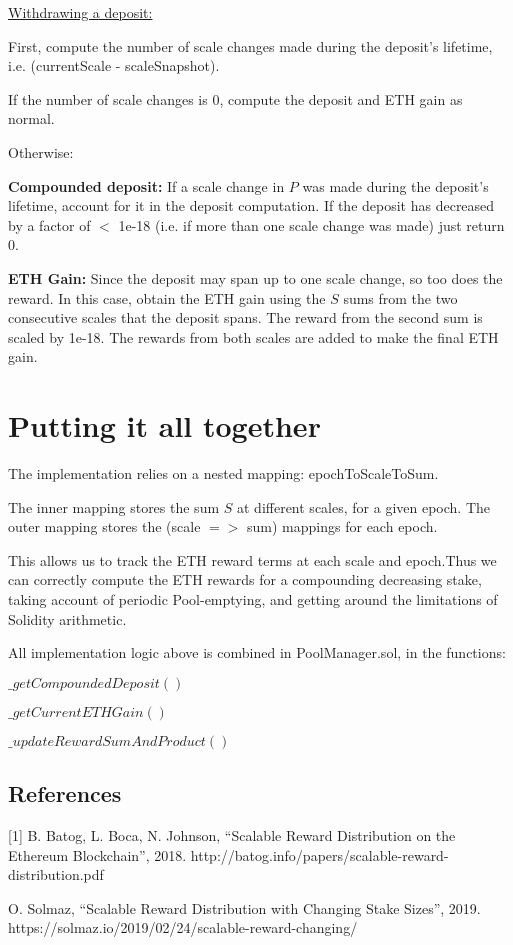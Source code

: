 \documentclass[reqno]{article}
\begin{document}
\bigskip
\underline{Withdrawing a deposit:}

First, compute the number of scale changes made during the deposit’s lifetime, i.e. (currentScale - scaleSnapshot).

\bigskip
If the number of scale changes is 0, compute the deposit and ETH gain as normal.

\bigskip
Otherwise:

\bigskip
\textbf{Compounded deposit:} If a scale change in {$P$} was made during the deposit's lifetime, account for it in the deposit computation. If the deposit has decreased by a factor of $<$ 1e-18 (i.e. if more than one scale change was made) just return 0.

\bigskip
\textbf{ETH Gain:} Since the deposit may span up to one scale change, so too does the reward. In this case, obtain the ETH gain using the {$S$} sums from the two consecutive scales that the deposit spans. The reward from the second sum is scaled by 1e-18. The rewards from both scales are added to make the final ETH gain.

\bigskip
\section{Putting it all together}

\bigskip
The implementation relies on a nested mapping: epochToScaleToSum. 

\bigskip
The inner mapping stores the sum {$S$} at different scales, for a given epoch. The outer mapping stores the (scale $=>$ sum) mappings for each epoch.

\bigskip
This allows us to track the ETH reward terms at each scale and epoch.Thus we can correctly compute the ETH rewards for a compounding decreasing stake, taking account of periodic Pool-emptying, and getting around the limitations of Solidity arithmetic.

\bigskip
All implementation logic above is combined in PoolManager.sol, in the functions:

\bigskip
$\_getCompoundedDeposit()$

$\_getCurrentETHGain()$

$\_updateRewardSumAndProduct()$

\bigskip
\subsection*{References}

[1]  B. Batog, L. Boca, N. Johnson, “Scalable Reward Distribution on the Ethereum Blockchain”, 2018. 
http://batog.info/papers/scalable-reward-distribution.pdf

\bigskip
[2] O. Solmaz, “Scalable Reward Distribution with Changing Stake Sizes”, 2019.
https://solmaz.io/2019/02/24/scalable-reward-changing/
\end{document}
